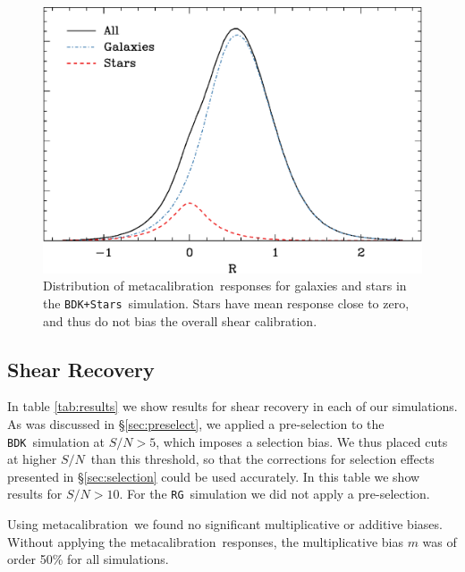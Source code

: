 \documentclass[a4paper,fleqn,usenatbib]{mnras}
\newcommand{\snr}{$S/N$}
\newcommand{\mcal}{metacalibration}
\newcommand{\bdsim}{\texttt{BDK}}
\newcommand{\bdstar}{\texttt{BDK+Stars}}
\newcommand{\rgsim}{\texttt{RG}}
\begin{document}
\begin{figure}
    \centering
    \includegraphics[width=\columnwidth]{R-bdj03-bdj03stars.eps}

    \caption{Distribution of \mcal\ responses for galaxies and stars in
    the \bdstar\ simulation.  Stars have mean response close to zero,
    and thus do not bias the overall shear calibration.}

\label{fig:Rstars}
\end{figure}



\subsection{Shear Recovery} \label{sec:shear_recover}


In table \ref{tab:results} we show results for shear recovery in each of our
simulations.  As was discussed in \S \ref{sec:preselect}, we applied a
pre-selection to the \bdsim\ simulation at \snr$ > 5$, which imposes a
selection bias.  We thus placed cuts at higher \snr\ than this threshold, so
that the corrections for selection effects presented in \S \ref{sec:selection}
could be used accurately.  In this table we show results for \snr$ > 10$.  
For the \rgsim\ simulation we did not apply a pre-selection.

Using \mcal\ we found no significant multiplicative or additive biases.
Without applying the \mcal\ responses, the multiplicative bias $m$ was of order
50\% for all simulations.
\end{document}
